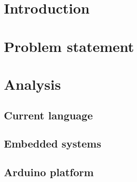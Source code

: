 


\frontmatter %


\cleardoublepage %


\cleardoublepage

\cleardoublepage

\cleardoublepage



\setlength\parskip{0ex} %
\tableofcontents* %
\setlength{\parskip}{3mm} %



\label{marker}
\mainmatter

\pagestyle{custom}

\chapter{Introduction}

\chapter{Problem statement}
\chapter{Analysis}
	\section{Current language}
	\section{Embedded systems}
	\section{Arduino platform}

